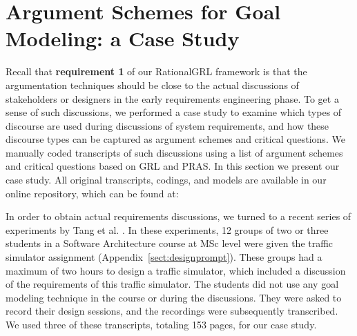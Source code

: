 \section{Argument Schemes for Goal Modeling: a Case Study}
\label{sect:gmas}

Recall that \textbf{requirement 1} of our RationalGRL framework is that the argumentation techniques should be close to the actual discussions of stakeholders or designers in the early requirements engineering phase. To get a sense of such discussions, we performed a case study to examine which types of discourse are used during discussions of system requirements, and how these discourse types can be captured as argument schemes and critical questions. We manually coded transcripts of such discussions using a list of argument schemes and critical questions based on GRL and PRAS. In this section we present our case study. All original transcripts, codings, and models are available in our online repository, which can be found at:  
 
\begin{quote}
\rationalgrlurl{}
\end{quote}

In order to obtain actual requirements discussions, we turned to a recent series of experiments by Tang et al. \cite{TangEtal2018}. In these experiments, 12 groups of two or three students in a Software Architecture course at MSc level were given the traffic simulator assignment (Appendix~\ref{sect:designprompt}). These groups had a maximum of two hours to design a traffic simulator, which included a discussion of the requirements of this traffic simulator. The students did not use any goal modeling technique in the course or during the discussions. They were asked to record their design sessions, and the recordings were subsequently transcribed. We used three of these transcripts, totaling 153 pages, for our case study. 


